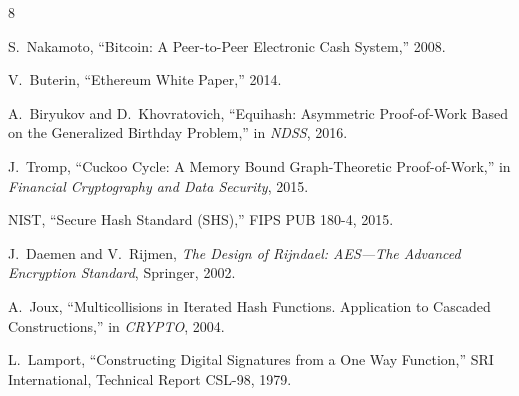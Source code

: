 \documentclass[preprint]{iacrtrans}
\begin{document}
\begin{thebibliography}{8}

S.~Nakamoto, ``Bitcoin: A Peer-to-Peer Electronic Cash System,'' 2008.

V.~Buterin, ``Ethereum White Paper,'' 2014.

A.~Biryukov and D.~Khovratovich, ``Equihash: Asymmetric Proof-of-Work Based on the Generalized Birthday Problem,'' in \emph{NDSS}, 2016.

J.~Tromp, ``Cuckoo Cycle: A Memory Bound Graph-Theoretic Proof-of-Work,'' in \emph{Financial Cryptography and Data Security}, 2015.

NIST, ``Secure Hash Standard (SHS),'' FIPS PUB 180-4, 2015.

J.~Daemen and V.~Rijmen, \emph{The Design of Rijndael: AES---The Advanced Encryption Standard}, Springer, 2002.

A.~Joux, ``Multicollisions in Iterated Hash Functions. Application to Cascaded Constructions,'' in \emph{CRYPTO}, 2004.

L.~Lamport, ``Constructing Digital Signatures from a One Way Function,'' SRI International, Technical Report CSL-98, 1979.

\end{thebibliography}
\end{document}
